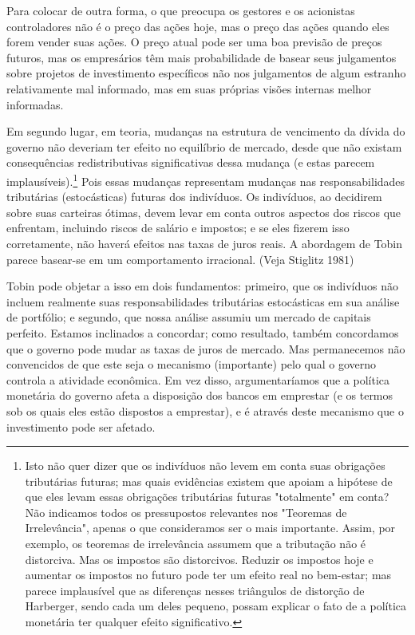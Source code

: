 \documentclass[12pt]{article}
\begin{document}
Para colocar de outra forma, o que preocupa os gestores e os acionistas controladores não é o preço das ações hoje, mas o preço das ações quando eles forem vender suas ações. O preço atual pode ser uma boa previsão de preços futuros, mas os empresários têm mais probabilidade de basear seus julgamentos sobre projetos de investimento específicos não nos julgamentos de algum estranho relativamente mal informado, mas em suas próprias visões internas melhor informadas.

Em segundo lugar, em teoria, mudanças na estrutura de vencimento da dívida do governo não deveriam ter efeito no equilíbrio de mercado, desde que não existam consequências redistributivas significativas dessa mudança (e estas parecem implausíveis).\footnote{Isto não quer dizer que os indivíduos não levem em conta suas obrigações tributárias futuras; mas quais evidências existem que apoiam a hipótese de que eles levam essas obrigações tributárias futuras "totalmente" em conta? Não indicamos todos os pressupostos relevantes nos "Teoremas de Irrelevância", apenas o que consideramos ser o mais importante. Assim, por exemplo, os teoremas de irrelevância assumem que a tributação não é distorciva. Mas os impostos são distorcivos. Reduzir os impostos hoje e aumentar os impostos no futuro pode ter um efeito real no bem-estar; mas parece implausível que as diferenças nesses triângulos de distorção de Harberger, sendo cada um deles pequeno, possam explicar o fato de a política monetária ter qualquer efeito significativo.} Pois essas mudanças representam mudanças nas responsabilidades tributárias (estocásticas) futuras dos indivíduos. Os indivíduos, ao decidirem sobre suas carteiras ótimas, devem levar em conta outros aspectos dos riscos que enfrentam, incluindo riscos de salário e impostos; e se eles fizerem isso corretamente, não haverá efeitos nas taxas de juros reais. A abordagem de Tobin parece basear-se em um comportamento irracional. (Veja Stiglitz 1981)

Tobin pode objetar a isso em dois fundamentos: primeiro, que os indivíduos não incluem realmente suas responsabilidades tributárias estocásticas em sua análise de portfólio; e segundo, que nossa análise assumiu um mercado de capitais perfeito. Estamos inclinados a concordar; como resultado, também concordamos que o governo pode mudar as taxas de juros de mercado. Mas permanecemos não convencidos de que este seja o mecanismo (importante) pelo qual o governo controla a atividade econômica. Em vez disso, argumentaríamos que a política monetária do governo afeta a disposição dos bancos em emprestar (e os termos sob os quais eles estão dispostos a emprestar), e é através deste mecanismo que o investimento pode ser afetado.
\end{document}
